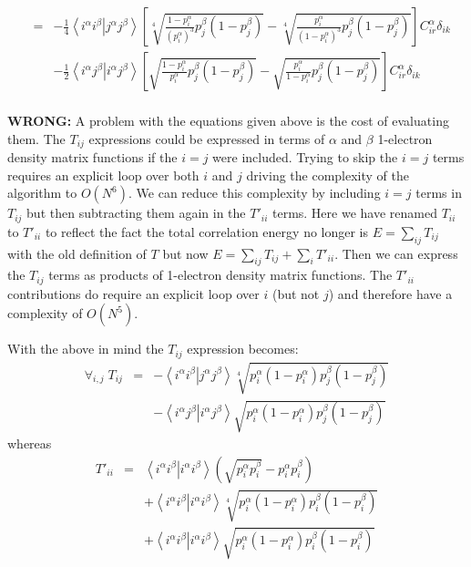 \documentclass[pra]{revtex4-1}
\newcommand{\eria}[4]{\left\langle #1^\alpha #2^\beta \right.\left| #3^\alpha #4^\beta \right\rangle}
\begin{document}
\begin{eqnarray}
   &=&  -\frac{1}{4}\eria{i}{i}{j}{j} 
         \left[
             \sqrt[4]{\frac{1-p_i^\alpha}{\left(p_i^\alpha\right)^3}p_j^\beta(1-p_j^\beta)}
            -\sqrt[4]{\frac{p_i^\alpha}{\left(1-p_i^\alpha\right)^3}p_j^\beta(1-p_j^\beta)}
         \right]
         C_{ir}^{\alpha}\delta_{ik}
         \nonumber \\
   &&   -\frac{1}{2}\eria{i}{j}{i}{j}
         \left[
             \sqrt{\frac{1-p_i^\alpha}{p_i^\alpha}p_j^\beta(1-p_j^\beta)}
            -\sqrt{\frac{p_i^\alpha}{1-p_i^\alpha}p_j^\beta(1-p_j^\beta)}
         \right]
         C_{ir}^{\alpha}\delta_{ik} \\
\end{eqnarray}

{\bf WRONG:}
A problem with the equations given above is the cost of evaluating them. The $T_{ij}$ expressions
could be expressed in terms of $\alpha$ and $\beta$ 1-electron density matrix functions if the
$i = j$ were included. Trying to skip the $i = j$ terms requires an explicit loop over
both $i$ and $j$ driving the complexity of the algorithm to $O(N^6)$. We can reduce this 
complexity by including $i = j$ terms in $T_{ij}$ but then subtracting them again in the
$T'_{ii}$ terms. Here we have renamed $T_{ii}$ to $T'_{ii}$ to reflect the fact the total 
correlation energy no longer is $E=\sum_{ij}T_{ij}$ with the old definition of $T$ but now
$E=\sum_{ij}T_{ij}+\sum_i T'_{ii}$.
Then we can express the $T_{ij}$ terms as products of 1-electron density 
matrix functions. The $T'_{ii}$ contributions do require an explicit loop over $i$ (but not $j$)
and therefore have a complexity of $O(N^5)$.

With the above in mind the $T_{ij}$ expression becomes:
\begin{eqnarray}
   \forall_{i,j}\;
   T_{ij} &=&  -\eria{i}{i}{j}{j} \sqrt[4]{p_i^\alpha(1-p_i^\alpha) p_j^\beta(1-p_j^\beta)} \nonumber \\
          &&   -\eria{i}{j}{i}{j} \sqrt{p_i^\alpha(1-p_i^\alpha) p_j^\beta(1-p_j^\beta)}
\end{eqnarray}
whereas 
\begin{eqnarray}
  T'_{ii} &=&  \eria{i}{i}{i}{i} \left(\sqrt{p_i^\alpha p_i^\beta}-p_i^\alpha p_i^\beta\right)
               \nonumber \\
          &&  +\eria{i}{i}{i}{i} \sqrt[4]{p_i^\alpha(1-p_i^\alpha) p_i^\beta(1-p_i^\beta)}
               \nonumber \\
          &&  +\eria{i}{i}{i}{i} \sqrt{p_i^\alpha(1-p_i^\alpha) p_i^\beta(1-p_i^\beta)}
\end{eqnarray}
\end{document}
